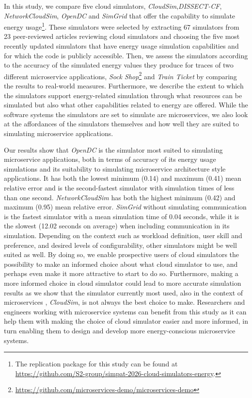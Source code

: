 In this study, we compare five cloud simulators, \textit{CloudSim},\textit{DISSECT-CF}, \textit{NetworkCloudSim}, \textit{OpenDC} and \textit{SimGrid} that offer the capability to simulate energy usage\footnote{The replication package for this study can be found at \url{https://github.com/S2-group/simpat-2026-cloud-simulators-energy}.}. These simulators were selected by extracting 67 simulators from 23 peer-reviewed articles reviewing cloud simulators and choosing the five most recently updated simulators that have energy usage simulation capabilities and for which the code is publicly accessible. 
Then, we assess the simulators according to the accuracy of the simulated  energy values they produce for traces of two different microservice applications, \textit{Sock Shop}\footnote{\url{https://github.com/microservices-demo/microservices-demo}} and \textit{Train Ticket} \cite{zhou_benchmarking_2018} by comparing the results to real-world measures. Furthermore, we describe the extent to which the simulators support energy-related simulation through what resources can be simulated but also what other capabilities related to energy are offered. While the software systems the simulators are set to simulate are microservices, we also look at the affordances of the simulators themselves and how well they are suited to simulating microservice applications.

Our results show that \textit{OpenDC} is the simulator most suited to simulating  microservice applications, both in terms of accuracy of its energy usage simulations and its suitability to simulating microservice architecture style applications. It has both the lowest minimum (0.14) and maximum (0.41) mean relative error and is the second-fastest simulator with simulation times of less than one second. \textit{NetworkCloudSim} has both the highest minimum (0.42) and maximum (0.95) mean relative error. \textit{SimGrid} without simulating communication is the fastest simulator with a mean simulation time of 0.04 seconds, while it is the slowest (12.02 seconds on average) when including communication in its simulation. Depending on the context such as workload definition, user skill and preference, and desired levels of configurability, other simulators might be well suited as well. By doing so, we enable prospective users of cloud simulators the possibility to make an informed choice about what cloud simulator to use, and perhaps even make it more attractive to start to do so. Furthermore, making a more informed choice in cloud simulator could lead to more accurate simulation results as we show that the simulator currently most used, also in the context of microservices \cite{araujo_energy_2024}, \textit{CloudSim}, is not always the best choice to make. Researchers and engineers working with microservice systems can benefit from this study as it can help them with making the choice of cloud simulator easier and more informed, in turn enabling them to design and develop more energy-conscious microservice systems.



